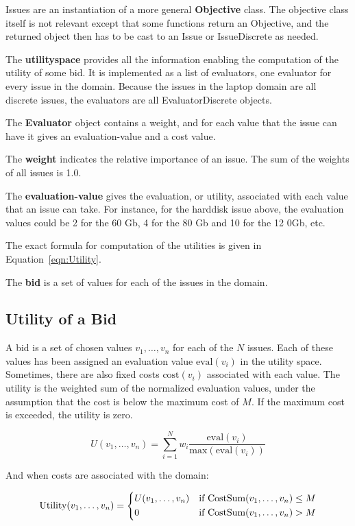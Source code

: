 \documentclass[]{article}
\begin{document}
Issues are an instantiation of a more general {\bf Objective} class. The objective class itself is not relevant except that some functions return an Objective, and the returned object then has to be cast to an Issue or IssueDiscrete as needed.

The {\bf utilityspace} provides all the information enabling the computation of the utility of some bid. It is implemented as a list of evaluators, one evaluator for every issue in the domain. Because the issues in the laptop domain are all discrete issues, the evaluators are all EvaluatorDiscrete objects.

The {\bf Evaluator} object contains a weight, and for each value that the issue can have it gives an evaluation-value and a cost value.

The {\bf weight} indicates the relative importance of an issue. The sum of the weights of all issues is 1.0.

The {\bf evaluation-value} gives the evaluation, or utility, associated with each value that an issue can take. For instance, for the harddisk issue above, the evaluation values could be 2 for the 60 Gb, 4 for the 80 Gb and 10 for the 12 0Gb, etc.

The exact formula for computation of the utilities is given in Equation~\ref{eqn:Utility}.

The {\bf bid} is a set of values for each of the issues in the domain.

\subsection{Utility of a Bid}

A bid is a set of chosen values $v_1, \ldots, v_n$  for each of the $N$ issues. Each of these values has been assigned an evaluation value $\text{eval}(v_i)$ in the utility space. Sometimes, there are also fixed costs $\text{cost}(v_i)$ associated with each value. The utility is the weighted sum of the normalized evaluation values, under the assumption that the cost is below the maximum cost of $M$. If the maximum cost is exceeded, the utility is zero.

\begin{equation}
	U(v_1, \ldots, v_n) = \sum_{i=1}^{N} w_i \dfrac{\text{eval}(v_i)}{\text{max}(\text{eval}(v_i))}
\end{equation}

And when costs are associated with the domain:

\begin{equation}
	\text{Utility}(v_1, \ldots, v_n) = 
		\begin{dcases*}
			U(v_1, \ldots, v_n) & if CostSum$(v_1, \ldots, v_n) \leq M$\\
			0 & if CostSum$(v_1, \ldots, v_n) > M$\\
		\end{dcases*}
\label{eqn:Utility}
\end{equation}
\end{document}
